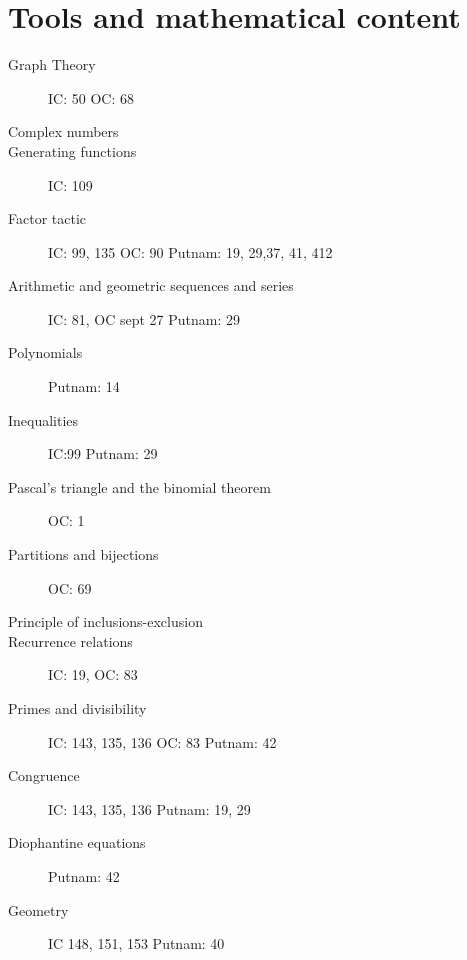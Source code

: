 \documentclass[11pt]{article}
\begin{document}
\section{Tools and mathematical content}
\begin{description}
    \item[Graph Theory] IC: 50 OC: 68
    \item[Complex numbers]
    \item[Generating functions] IC: 109
    \item[Factor tactic]IC: 99, 135 OC: 90 Putnam: 19, 29,37, 41, 412 
    \item[Arithmetic and geometric sequences and series] IC: 81, OC sept 27 Putnam: 29
    \item[Polynomials] Putnam: 14
    \item[Inequalities] IC:99 Putnam: 29
    \item[Pascal's triangle and the binomial theorem] OC: 1
    \item[Partitions and bijections] OC: 69
    \item[Principle of inclusions-exclusion]
    \item[Recurrence relations] IC: 19, OC: 83
    \item[Primes and divisibility] IC: 143, 135, 136 OC: 83 Putnam: 42
    \item[Congruence] IC: 143, 135, 136 Putnam: 19, 29
    \item[Diophantine equations] Putnam: 42
    \item[Geometry] IC 148, 151, 153 Putnam: 40         
\end{description}
\end{document}
